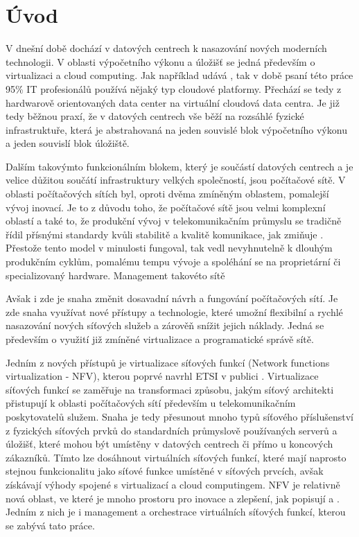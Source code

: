 
\chapter{Úvod}

V dnešní době dochází v datových centrech k nasazování nových moderních technologii. V oblasti výpočetního výkonu a úložišť se jedná především o virtualizaci a cloud computing. Jak například udává \cite{Cloud_adoption} , tak v době psaní této práce 95\% IT profesionálů používá nějaký typ cloudové platformy. Přechází se tedy z hardwarově orientovaných data center na virtuální cloudová data centra. Je již tedy běžnou praxí, že v datových centrech vše běží na rozsáhlé fyzické infrastruktuře, která je abstrahovaná na jeden souvislé blok výpočetního výkonu a jeden souvislí blok úložiště.

Dalším takovýmto funkcionálním blokem, který je součástí datových centrech a je velice důžitou součátí infrastruktury velkých společností, jsou počítačové sítě. V oblasti počítačových sítích byl, oproti dvěma zmíněným oblastem, pomalejší vývoj inovací. Je to z důvodu toho, že počítačové sítě jsou velmi komplexní oblastí a také to, že produkční vývoj v telekomunikačním průmyslu se tradičně řídil přísnými standardy kvůli stabilitě a kvalitě komunikace, jak zmiňuje \cite{telco} . Přestože tento model v minulosti fungoval, tak vedl nevyhnutelně k dlouhým produkčním cyklům, pomalému tempu vývoje a spoléhání se na proprietární či specializovaný hardware. Management takovéto sítě 

Avšak i zde je snaha změnit dosavadní návrh a fungování počítačových sítí. Je zde snaha využívat nové přístupy a technologie, které umožní flexibilní a rychlé nasazování nových síťových služeb a zárověň snížit jejich náklady. Jedná se především o využití již zmíněné virtualizace a programatické správě sítě. \cite{Toward_Unified}

Jedním z nových přístupů je virtualizace síťových funkcí (Network functions virtualization - NFV), kterou poprvé navrhl ETSI v publici \cite{NFV_paper2012} . Virtualizace síťových funkcí se zaměřuje na transformaci způsobu, jakým síťový architekti přistupují k oblasti počítačových sítí především u telekomunikačním poskytovatelů služem. Snaha je tedy přesunout mnoho typů síťového příslušenství z fyzických síťových prvků do standardních průmyslově používaných serverů a úložišť, které mohou být umístěny v datových centrech či přímo u koncových zákazníků. Tímto lze dosáhnout virtuálních síťových funkcí, které mají naprosto stejnou funkcionalitu jako síťové funkce umístěné v síťových prvcích, avšak získávají výhody spojené s virtualizací a cloud computingem. NFV je relativně nová oblast, ve které je mnoho prostoru pro inovace a zlepšení, jak popisují \cite{NFVChalanges} a \cite{NFVState}. Jedním z nich je i management a orchestrace virtuálních síťových funkcí, kterou se zabývá tato práce.


